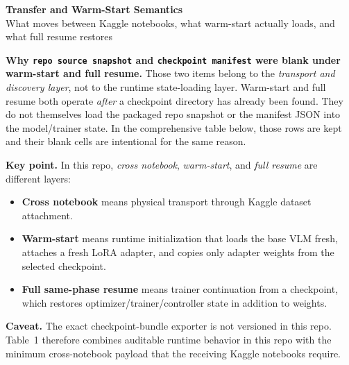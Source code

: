\documentclass[11pt]{article}
\newcommand{\code}[1]{\texttt{#1}}
\begin{document}
\begin{center}
{\LARGE \textbf{Transfer and Warm-Start Semantics}}\\[0.5em]
{\large What moves between Kaggle notebooks, what warm-start actually loads, and what full resume restores}\\[0.75em]
\end{center}

\noindent\textbf{Why \code{repo source snapshot} and \code{checkpoint manifest} were blank under warm-start and full resume.}
Those two items belong to the \emph{transport and discovery layer}, not to the runtime state-loading layer.
Warm-start and full resume both operate \emph{after} a checkpoint directory has already been found.
They do not themselves load the packaged repo snapshot or the manifest JSON into the model/trainer state.
In the comprehensive table below, those rows are kept and their blank cells are intentional for the same reason.

\vspace{0.35em}
\noindent\textbf{Key point.}
In this repo, \emph{cross notebook}, \emph{warm-start}, and \emph{full resume} are different layers:
\begin{itemize}
\item \textbf{Cross notebook} means physical transport through Kaggle dataset attachment.
\item \textbf{Warm-start} means runtime initialization that loads the base VLM fresh, attaches a fresh LoRA adapter, and copies only adapter weights from the selected checkpoint.
\item \textbf{Full same-phase resume} means trainer continuation from a checkpoint, which restores optimizer/trainer/controller state in addition to weights.
\end{itemize}

\noindent\textbf{Caveat.}
The exact checkpoint-bundle exporter is not versioned in this repo.
Table~1 therefore combines auditable runtime behavior in this repo with the minimum cross-notebook payload that the receiving Kaggle notebooks require.

\vspace{0.45em}
\renewcommand{\arraystretch}{1.06}
\setlength{\tabcolsep}{2pt}
\fontsize{7.1}{8.1}\selectfont
\end{document}
